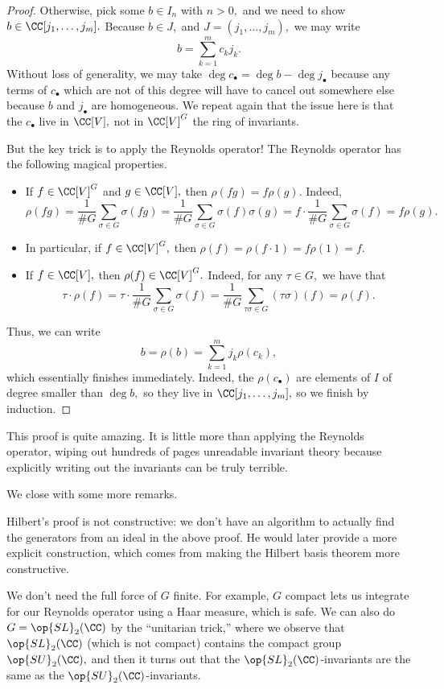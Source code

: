\documentclass[../notes.tex]{subfiles}
\begin{document}
\begin{proof}
	Otherwise, pick some $b\in I_n$ with $n>0,$ and we need to show $b\in\CC[j_1,\ldots,j_m].$ Because $b\in J,$ and $J=(j_1,\ldots,j_m),$ we may write
	\[b=\sum_{k=1}^mc_kj_k.\]
	Without loss of generality, we may take $\deg c_\bullet=\deg b-\deg j_\bullet$ because any terms of $c_\bullet$ which are not of this degree will have to cancel out somewhere else because $b$ and $j_\bullet$ are homogeneous. We repeat again that the issue here is that the $c_\bullet$ live in $\CC[V],$ not in $\CC[V]^G$ the ring of invariants.

	But the key trick is to apply the Reynolds operator! The Reynolds operator has the following magical properties.
	\begin{itemize}
		\item If $f\in\CC[V]^G$ and $g\in\CC[V],$ then $\rho(fg)=f\rho(g).$ Indeed,
		\[\rho(fg)=\frac1{\#G}\sum_{\sigma\in G}\sigma(fg)=\frac1{\#G}\sum_{\sigma\in G}\sigma(f)\sigma(g)=f\cdot\frac1{\#G}\sum_{\sigma\in G}\sigma(f)=f\rho(g).\]
		\item In particular, if $f\in\CC[V]^G,$ then $\rho(f)=\rho(f\cdot1)=f\rho(1)=f.$
		\item If $f\in\CC[V],$ then $\rho(f)\in\CC[V]^G.$ Indeed, for any $\tau\in G,$ we have that
		\[\tau\cdot\rho(f)=\tau\cdot\frac1{\#G}\sum_{\sigma\in G}\sigma(f)=\frac1{\#G}\sum_{\tau\sigma\in G}(\tau\sigma)(f)=\rho(f).\]
	\end{itemize}
	Thus, we can write
	\[b=\rho(b)=\sum_{k=1}^mj_k\rho(c_k),\]
	which essentially finishes immediately. Indeed, the $\rho(c_\bullet)$ are elements of $I$ of degree smaller than $\deg b,$ so they live in $\CC[j_1,\ldots,j_m],$ so we finish by induction.
\end{proof}
\begin{remark}
	This proof is quite amazing. It is little more than applying the Reynolds operator, wiping out hundreds of pages unreadable invariant theory because explicitly writing out the invariants can be truly terrible.
\end{remark}
We close with some more remarks.
\begin{remark}
	Hilbert's proof is not constructive: we don't have an algorithm to actually find the generators from an ideal in the above proof. He would later provide a more explicit construction, which comes from making the Hilbert basis theorem more constructive.
\end{remark}
\begin{remark}
	We don't need the full force of $G$ finite. For example, $G$ compact lets us integrate for our Reynolds operator using a Haar measure, which is safe. We can also do $G=\op{SL}_2(\CC)$ by the ``unitarian trick,'' where we observe that $\op{SL}_2(\CC)$ (which is not compact) contains the compact group $\op{SU}_2(\CC),$ and then it turns out that the $\op{SL}_2(\CC)$-invariants are the same as the $\op{SU}_2(\CC)$-invariants.
\end{remark}
\end{document}
